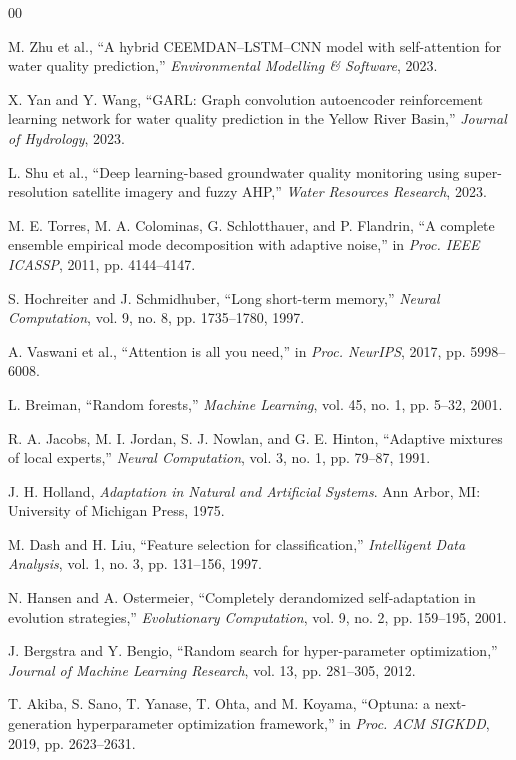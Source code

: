 \documentclass[conference]{IEEEtran}
\begin{document}
\begin{thebibliography}{00}

 M. Zhu et al., ``A hybrid CEEMDAN--LSTM--CNN model with
self-attention for water quality prediction,'' \emph{Environmental Modelling
\& Software}, 2023.

 X. Yan and Y. Wang, ``GARL: Graph convolution autoencoder
reinforcement learning network for water quality prediction in the Yellow River
Basin,'' \emph{Journal of Hydrology}, 2023.

 L. Shu et al., ``Deep learning-based groundwater quality
monitoring using super-resolution satellite imagery and fuzzy AHP,''
\emph{Water Resources Research}, 2023.

 M. E. Torres, M. A. Colominas, G. Schlotthauer, and P.
Flandrin, ``A complete ensemble empirical mode decomposition with adaptive
noise,'' in \emph{Proc. IEEE ICASSP}, 2011, pp. 4144--4147.

 S. Hochreiter and J. Schmidhuber, ``Long short-term
memory,'' \emph{Neural Computation}, vol. 9, no. 8, pp. 1735--1780, 1997.

 A. Vaswani et al., ``Attention is all you need,'' in
\emph{Proc. NeurIPS}, 2017, pp. 5998--6008.

 L. Breiman, ``Random forests,'' \emph{Machine Learning},
vol. 45, no. 1, pp. 5--32, 2001.

 R. A. Jacobs, M. I. Jordan, S. J. Nowlan, and G. E. Hinton,
``Adaptive mixtures of local experts,'' \emph{Neural Computation}, vol. 3,
no. 1, pp. 79--87, 1991.

 J. H. Holland, \emph{Adaptation in Natural and Artificial
Systems}. Ann Arbor, MI: University of Michigan Press, 1975.

 M. Dash and H. Liu, ``Feature selection for classification,''
\emph{Intelligent Data Analysis}, vol. 1, no. 3, pp. 131--156, 1997.

 N. Hansen and A. Ostermeier, ``Completely derandomized
self-adaptation in evolution strategies,'' \emph{Evolutionary Computation},
vol. 9, no. 2, pp. 159--195, 2001.

 J. Bergstra and Y. Bengio, ``Random search for
hyper-parameter optimization,'' \emph{Journal of Machine Learning Research},
vol. 13, pp. 281--305, 2012.

 T. Akiba, S. Sano, T. Yanase, T. Ohta, and M. Koyama,
``Optuna: a next-generation hyperparameter optimization framework,'' in
\emph{Proc. ACM SIGKDD}, 2019, pp. 2623--2631.


\end{thebibliography}
\end{document}
